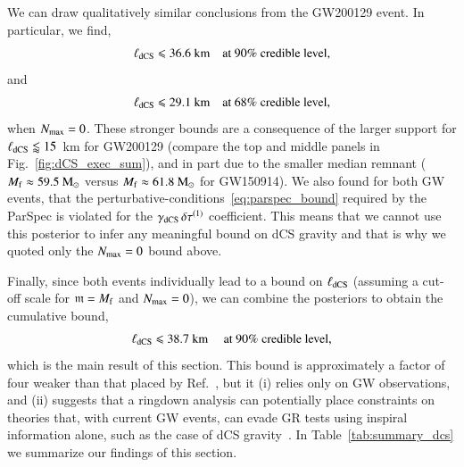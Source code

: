 \documentclass[twocolumn,
               prd,
               aps,
               superscriptaddress,
               tightenlines,
               nofootinbib,
               eqsecnum,
               amsfonts,
               amsmath,
               longbibliography]{revtex4-1}
\newcommand{\gm}{\mathfrak{m}}
\newcommand{\msun}{~{\rm M}_{\odot}}
\begin{document}
We can draw qualitatively similar conclusions from the GW200129 event.
In particular, we find,
%
\begin{equation}
\ell_{\rm dCS} \leqslant 36.6~\textrm{km}
\quad \textrm{at 90\% credible level},
\end{equation}
%
and
%
\begin{equation}
\ell_{\rm dCS} \leqslant 29.1~\textrm{km}
\quad \textrm{at 68\% credible level},
\end{equation}
%
when $N_{\rm max}=0$.
%
These stronger bounds are a consequence of the larger support for $\ell_{\rm dCS} \lessapprox 15$~km
for GW200129 (compare the top and middle panels in Fig.~\ref{fig:dCS_exec_sum}), and in part due to
the smaller median remnant ($M_{\rm f} \approx 59.5\msun$ versus $M_{\rm f} \approx 61.8\msun$ for GW150914).
%
We also found for both GW events, that the perturbative-conditions~\eqref{eq:parspec_bound} required by the ParSpec
is violated for the $\gamma_{\rm dCS} \, \delta \tau^{(1)}$ coefficient.
%
This means that we cannot use this posterior to infer any meaningful bound on dCS gravity
and that is why we quoted only the $N_{\rm max}=0$ bound above.

Finally, since both events individually lead to a bound on $\ell_{\rm dCS}$
(assuming a cut-off scale for $\gm = M_{\rm f}$ and $N_{\rm max}=0$), we can combine the
posteriors to obtain the cumulative bound,
%
\begin{equation}
\ell_{\rm dCS} \leqslant 38.7~\textrm{km}
\quad \textrm{ at 90\% credible level},
\end{equation}
%
which is the main result of this section.
%
This bound is approximately a factor of four weaker than that placed by
Ref.~\cite{Silva:2020acr}, but it
%
(i) relies only on GW observations, and
%
(ii) suggests that a ringdown analysis can potentially place constraints on
theories that, with current GW events, can evade GR tests using inspiral information
alone, such as the case of dCS gravity~\cite{Nair:2019iur,Perkins:2021mhb,Lyu:2022gdr}.
%
In Table~\ref{tab:summary_dcs} we summarize our findings of this section.
\end{document}

